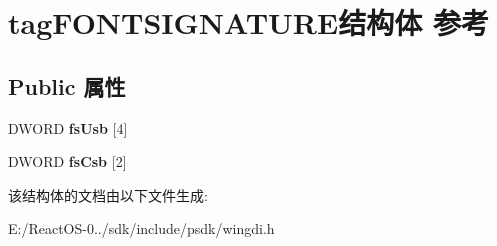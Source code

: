 \hypertarget{structtag_f_o_n_t_s_i_g_n_a_t_u_r_e}{}\section{tag\+F\+O\+N\+T\+S\+I\+G\+N\+A\+T\+U\+R\+E结构体 参考}
\label{structtag_f_o_n_t_s_i_g_n_a_t_u_r_e}
\subsection*{Public 属性}
\begin{DoxyCompactItemize}
\item 
\mbox{\label{structtag_f_o_n_t_s_i_g_n_a_t_u_r_e_a5e8fef0572c07953fe08ef6dd381fd3d}} 
D\+W\+O\+RD {\bfseries fs\+Usb} \mbox{[}4\mbox{]}
\item 
\mbox{\label{structtag_f_o_n_t_s_i_g_n_a_t_u_r_e_a74a9839beedbd62d7c7a160783000d0a}} 
D\+W\+O\+RD {\bfseries fs\+Csb} \mbox{[}2\mbox{]}
\end{DoxyCompactItemize}


该结构体的文档由以下文件生成\+:\begin{DoxyCompactItemize}
\item 
E\+:/\+React\+O\+S-\/0../sdk/include/psdk/wingdi.\+h\end{DoxyCompactItemize}
